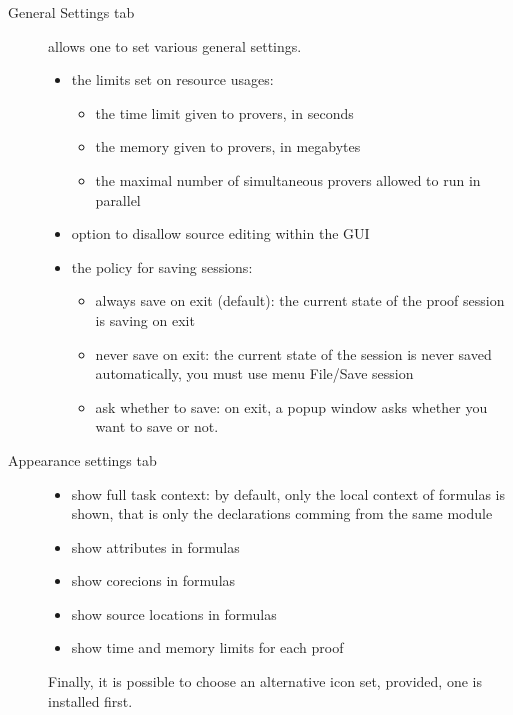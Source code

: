 \begin{description}
\item[\textsf{General Settings} tab] allows one to set
  various general settings.
\begin{itemize}
\item the limits set on resource usages:
  \begin{itemize}
  \item the time limit given to provers, in seconds
  \item the memory given to provers, in megabytes
  \item the maximal number of simultaneous provers allowed to run in parallel
  \end{itemize}
\item option to disallow source editing within the GUI
\item the policy for saving sessions:
  \begin{itemize}
  \item always save on exit (default): the current state of the proof session is saving on exit
  \item never save on exit: the current state of the session is never saved
    automatically, you must use menu \textsf{File/Save session}
  \item ask whether to save: on exit, a popup window asks whether you
    want to save or not.
  \end{itemize}
\end{itemize}

\item[\textsf{Appearance settings} tab]\emptyitem
  \begin{itemize}
  \item show full task context: by default, only the local context of
    formulas is shown, that is only the declarations comming from the
    same module
  \item show attributes in formulas
  \item show corecions in formulas
  \item show source locations in formulas
  \item show time and memory limits for each proof
  \end{itemize}
  Finally, it is possible to choose an alternative icon set, provided,
  one is installed first.


\end{description}
